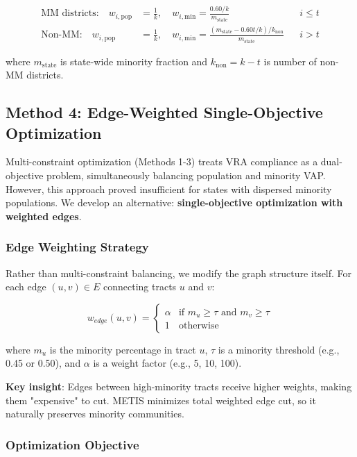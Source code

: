 \begin{align}
\text{MM districts:} \quad w_{i,\text{pop}} &= \frac{1}{k}, \quad w_{i,\text{min}} = \frac{0.60/k}{m_{\text{state}}} && i \leq t\\
\text{Non-MM:} \quad w_{i,\text{pop}} &= \frac{1}{k}, \quad w_{i,\text{min}} = \frac{(m_{\text{state}} - 0.60t/k)/k_{\text{non}}}{m_{\text{state}}} && i > t
\end{align}

where $m_{\text{state}}$ is state-wide minority fraction and $k_{\text{non}} = k - t$ is number of non-MM districts.

\subsection{Method 4: Edge-Weighted Single-Objective Optimization}

Multi-constraint optimization (Methods 1-3) treats VRA compliance as a dual-objective problem, simultaneously balancing population and minority VAP. However, this approach proved insufficient for states with dispersed minority populations. We develop an alternative: \textbf{single-objective optimization with weighted edges}.

\subsubsection{Edge Weighting Strategy}

Rather than multi-constraint balancing, we modify the graph structure itself. For each edge $(u, v) \in E$ connecting tracts $u$ and $v$:

\begin{equation}
w_{edge}(u, v) = \begin{cases}
\alpha & \text{if } m_u \geq \tau \text{ and } m_v \geq \tau \\
1 & \text{otherwise}
\end{cases}
\end{equation}

where $m_u$ is the minority percentage in tract $u$, $\tau$ is a minority threshold (e.g., 0.45 or 0.50), and $\alpha$ is a weight factor (e.g., 5, 10, 100).

\textbf{Key insight}: Edges between high-minority tracts receive higher weights, making them "expensive" to cut. METIS minimizes total weighted edge cut, so it naturally preserves minority communities.

\subsubsection{Optimization Objective}


